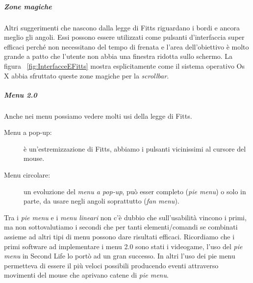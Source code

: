 				\subparagraph{Zone magiche}
					Altri suggerimenti che nascono dalla legge di Fitts riguardano i bordi e ancora meglio gli angoli. Essi possono essere utilizzati come pulsanti d'interfaccia super efficaci perché non necessitano del tempo di frenata e l'area dell'obiettivo è molto grande a patto che l'utente non abbia una finestra ridotta sullo schermo. La figura ~\ref{fig:InterfacceEFitts} mostra esplicitamente come il sistema operativo Os X abbia sfruttato queste zone magiche per la \emph{scrollbar}. 
				
				\subparagraph{Menu 2.0}
					Anche nei menu possiamo vedere molti usi della legge di Fitts.
					\begin{description}
						\item[Menu a pop-up:] è un'estremizzazione di Fitts, abbiamo i pulsanti vicinissimi al cursore del mouse.
						\item[Menu circolare:] un evoluzione del \emph{menu a pop-up}, può esser completo (\emph{pie menu}) o solo in parte, da usare negli angoli soprattutto (\emph{fan menu}).
					\end{description}
					Tra i \emph{pie menu} e i \emph{menu lineari} non c'è dubbio che sull'usabilità vincono i primi, ma non sottovalutiamo i secondi che  per tanti elementi/comandi se combinati assieme ad altri tipi di menu possono dare risultati efficaci.
					Ricordiamo che i primi software ad implementare i menu 2.0 sono stati i videogame, l'uso del \emph{pie menu} in Second Life lo portò ad un gran successo. In altri l'uso dei pie menu permetteva di essere il più veloci possibili producendo eventi attraverso movimenti del mouse che aprivano catene di \emph{pie menu}.
				
				